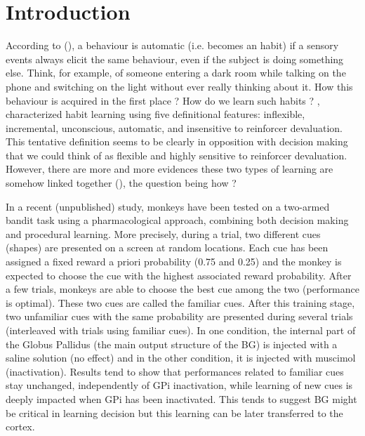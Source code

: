 \section{Introduction}

According to (\citet{Schneider1977}), a behaviour is automatic
(i.e. becomes an habit) if a sensory events always elicit the same behaviour,
even if the subject is doing something else. Think, for example, of someone
entering a dark room while talking on the phone and switching on the light
without ever really thinking about it. How this behaviour is acquired in the
first place ? How do we learn such habits ? \citet{Seger2011},
characterized habit learning using five definitional features: inflexible,
incremental, unconscious, automatic, and insensitive to reinforcer
devaluation. This tentative definition seems to be clearly in opposition with
decision making that we could think of as flexible and highly sensitive to
reinforcer devaluation. However, there are more and more evidences these two
types of learning are somehow linked together (\citet{Yin2006}), the
question being how ?

In a recent (unpublished) study, monkeys have been tested on a two-armed bandit
task using a pharmacological approach, combining both decision making and
procedural learning. More precisely, during a trial, two different cues
(shapes) are presented on a screen at random locations. Each cue has been
assigned a fixed reward a priori probability (0.75 and 0.25) and the monkey is
expected to choose the cue with the highest associated reward probability.
After a few trials, monkeys are able to choose the best cue among the two
(performance is optimal). These two cues are called the familiar cues. After
this training stage, two unfamiliar cues with the same probability are
presented during several trials (interleaved with trials using familiar
cues). In one condition, the internal part of the Globus Pallidus (the main
output structure of the BG) is injected with a saline solution (no effect) and
in the other condition, it is injected with muscimol (inactivation). Results
tend to show that performances related to familiar cues stay unchanged,
independently of GPi inactivation, while learning of new cues is deeply
impacted when GPi has been inactivated. This tends to suggest BG might be
critical in learning decision but this learning can be later transferred to the
cortex.





